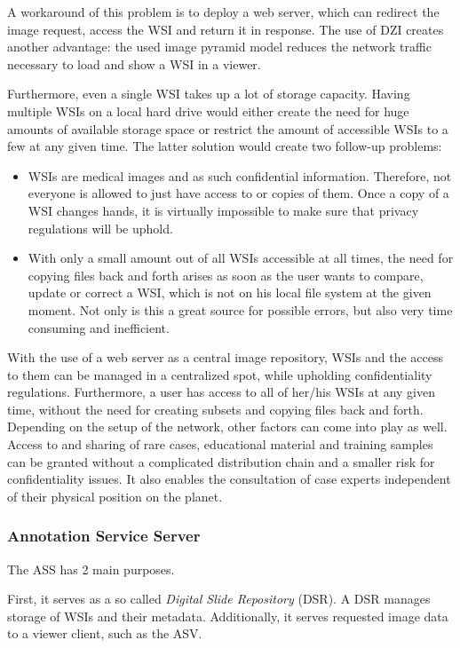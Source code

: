 A workaround of this problem is to deploy a web server, which can redirect the image request, access the WSI and return it in response\cite{Tseytlin14}. The use of DZI creates another advantage: the used image pyramid model reduces the network traffic necessary to load and show a WSI in a viewer\cite{Cornish13}\cite{DICOM10}.

Furthermore, even a single WSI takes up a lot of storage capacity\cite{Singh11}. Having multiple WSIs on a local hard drive would either create the need for huge amounts of available storage space or restrict the amount of accessible WSIs to a few at any given time. The latter solution would create two follow-up problems:
\begin{itemize}
	\item WSIs are medical images and as such confidential information. Therefore, not everyone is allowed to just have access to or copies of them\cite{COA}\cite{USSanDiego}. Once a copy of a WSI changes hands, it is virtually impossible to make sure that privacy regulations will be uphold.	
	\item With only a small amount out of all WSIs accessible at all times, the need for copying files back and forth arises as soon as the user wants to compare, update or correct a WSI, which is not on his local file system at the given moment. Not only is this a great source for possible errors, but also very time consuming and inefficient.
\end{itemize}

With the use of a web server as a central image repository, WSIs and the access to them can be managed in a centralized spot, while upholding confidentiality regulations. Furthermore, a user has access to all of her/his WSIs at any given time, without the need for creating subsets and copying files back and forth. Depending on the setup of the network, other factors can come into play as well. Access to and sharing of rare cases, educational material and training samples can be granted without a complicated distribution chain and a smaller risk for confidentiality issues. It also enables the consultation of case experts independent of their physical position on the planet\cite{Wilbur09}.


\subsubsection{Annotation Service Server}
The ASS has 2 main purposes.

First, it serves as a so called \emph{Digital Slide Repository} (DSR). A DSR manages storage of WSIs and their metadata. Additionally, it serves requested image data to a viewer client\cite{Cornish13}, such as the ASV. 

